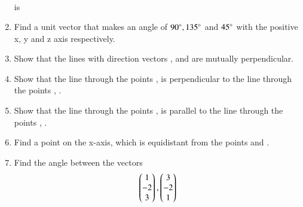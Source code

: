 \begin{enumerate}[label=\arabic*.,ref=\thesubsection.\theenumi]
\begin{multline}
\end{multline}
%
is 
\begin{enumerate}[itemsep = 2pt]
\end{enumerate}
\item Find a unit vector that makes an angle of $90\degree, 135\degree$ and $45\degree$ with the positive x, y and z axis respectively.
\item Show that the lines with direction vectors ,  and  are mutually perpendicular.
\item Show that the line through the points ,  is perpendicular to the line through the points   , .
\\
\solution 

\item Show that the line through the points ,  is parallel to the line through the points   , .
\item Find a point on the x-axis, which is equidistant from the points  and .
\item Find the angle between the vectors 
\begin{align}
\begin{pmatrix}1\\-2\\3\end{pmatrix},
\begin{pmatrix}3\\-2\\1\end{pmatrix}
\end{align}
\\
\solution 



\end{enumerate}
